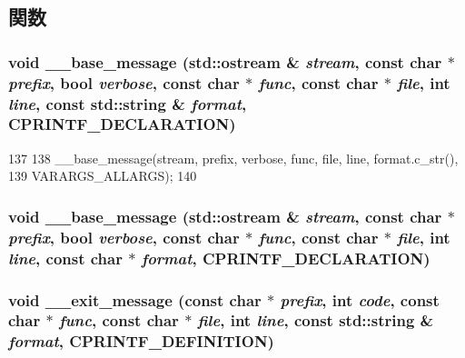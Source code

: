 \subsection{関数}
\hypertarget{base_2misc_8hh_a96eba51390695b43adbae0ca47225ce8}{
\subsubsection[{\_\-\_\-base\_\-message}]{\setlength{\rightskip}{0pt plus 5cm}void \_\-\_\-base\_\-message (std::ostream \& {\em stream}, \/  const char $\ast$ {\em prefix}, \/  bool {\em verbose}, \/  const char $\ast$ {\em func}, \/  const char $\ast$ {\em file}, \/  int {\em line}, \/  const std::string \& {\em format}, \/  CPRINTF\_\-DECLARATION)}}
\label{base_2misc_8hh_a96eba51390695b43adbae0ca47225ce8}



\begin{DoxyCode}
137 {
138     __base_message(stream, prefix, verbose, func, file, line, format.c_str(),
139               VARARGS_ALLARGS);
140 }
\end{DoxyCode}
\hypertarget{base_2misc_8hh_ae57acd68abdcfd027c698dceeed6c3c1}{
\subsubsection[{\_\-\_\-base\_\-message}]{\setlength{\rightskip}{0pt plus 5cm}void \_\-\_\-base\_\-message (std::ostream \& {\em stream}, \/  const char $\ast$ {\em prefix}, \/  bool {\em verbose}, \/  const char $\ast$ {\em func}, \/  const char $\ast$ {\em file}, \/  int {\em line}, \/  const char $\ast$ {\em format}, \/  CPRINTF\_\-DECLARATION)}}
\label{base_2misc_8hh_ae57acd68abdcfd027c698dceeed6c3c1}
\hypertarget{base_2misc_8hh_a2980c139d3566780f6d0decc610d66d2}{
\subsubsection[{\_\-\_\-exit\_\-message}]{\setlength{\rightskip}{0pt plus 5cm}void \_\-\_\-exit\_\-message (const char $\ast$ {\em prefix}, \/  int {\em code}, \/  const char $\ast$ {\em func}, \/  const char $\ast$ {\em file}, \/  int {\em line}, \/  const std::string \& {\em format}, \/  CPRINTF\_\-DEFINITION)}}
\label{base_2misc_8hh_a2980c139d3566780f6d0decc610d66d2}



